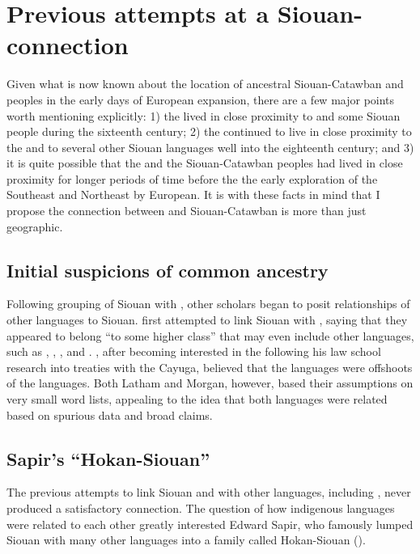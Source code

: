 \documentclass[output=paper]{LSP/langsci}
\begin{document}
\section{Previous attempts at a Siouan- connection}\label{sec:kasak:3}

Given what is now known about the location of ancestral Siouan-Catawban and  peoples in the early days of European expansion, there are a few major points worth mentioning explicitly: 1) the  lived in close proximity to  and some Siouan people during the sixteenth century; 2) the  continued to live in close proximity to the  and to several other Siouan languages well into the eighteenth century; and 3) it is quite possible that the  and the Siouan-Catawban peoples had lived in close proximity for longer periods of time before the the early exploration of the Southeast and Northeast by European. It is with these facts in mind that I propose the connection between  and Siouan-Catawban is more than just geographic.

\subsection{Initial suspicions of common ancestry}

Following  grouping of Siouan with , other scholars began to posit relationships of other languages to Siouan. \citet{Latham1856} first attempted to link Siouan with , saying that they appeared to belong ``to some higher class'' that may even include other languages, such as , , , and . \citet{Morgan1871}, after becoming interested in the  following his law school research into treaties with the Cayuga, believed that the  languages were offshoots of the  languages. Both Latham and Morgan, however, based their assumptions on very small word lists, appealing to the idea that both languages were related based on spurious data and broad claims.

\subsection{Sapir's ``Hokan-Siouan''}

The previous attempts to link Siouan and  with other languages, including , never produced a satisfactory connection. The question of how indigenous languages were related to each other greatly interested Edward Sapir, who famously lumped Siouan with many other languages into a family called Hokan-Siouan (\citealt{Sapir1929}). 
\end{document}
